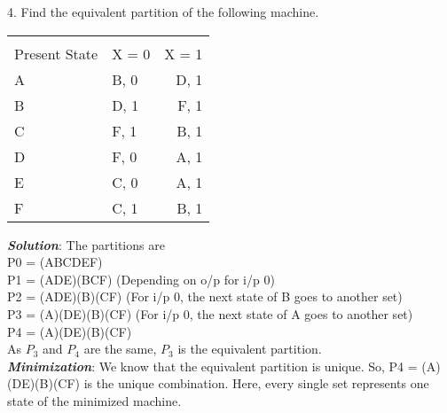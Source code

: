 \documentclass[12pt, a4paper]{article}
\begin{document}
4. Find the equivalent partition of the following machine. \\
\begin{center}
    \begin{tabular}{llr}  
    \toprule
    \multicolumn{3}{c}{}{Next State, z} \\
    \cmidrule(l){2-3}
    Present State    & X = 0 & X = 1 \\
    \midrule
    \phantom{20}\hspace{2ex}A      & B, 0    & D, 1      \\
    \phantom{20}\hspace{2ex}B      & D, 1    & F, 1      \\
    \phantom{20}\hspace{2ex}C      & F, 1    & B, 1      \\
    \phantom{20}\hspace{2ex}D      & F, 0    & A, 1      \\
    \phantom{20}\hspace{2ex}E      & C, 0    & A, 1      \\
    \phantom{20}\hspace{2ex}F      & C, 1    & B, 1      \\
    \bottomrule
    \end{tabular}
\end{center}
\textbf{\emph{Solution}}: The partitions are \\
\phantom{20}\hspace{5ex} P0 = (ABCDEF) \\
\phantom{20}\hspace{5ex} P1 = (ADE)(BCF) (Depending on o/p for i/p 0) \\
\phantom{20}\hspace{5ex} P2 = (ADE)(B)(CF) (For i/p 0, the next state of B goes to another set) \\
\phantom{20}\hspace{5ex} P3 = (A)(DE)(B)(CF) (For i/p 0, the next state of A goes to another set) \\
\phantom{20}\hspace{5ex} P4 = (A)(DE)(B)(CF) \\
As $P_{3}$ and $P_{4}$ are the same, $P_{3}$ is the equivalent partition. \\
\textbf{\emph{Minimization}}: We know that the equivalent partition is unique. So, P4 = (A)(DE)(B)(CF) is the
unique combination. Here, every single set represents one state of the minimized machine. \\
\end{document}
